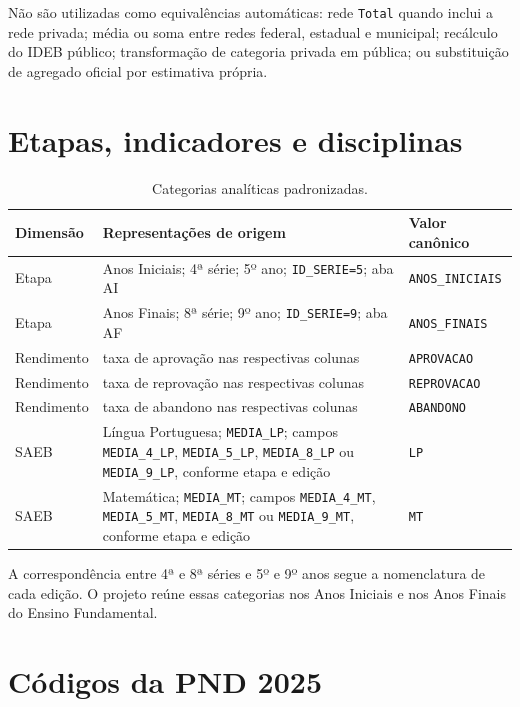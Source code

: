 Não são utilizadas como equivalências automáticas: rede \texttt{Total} quando inclui a rede privada; média ou soma entre redes federal, estadual e municipal; recálculo do IDEB público; transformação de categoria privada em pública; ou substituição de agregado oficial por estimativa própria.

\section{Etapas, indicadores e disciplinas}

\begin{table}[H]
\centering
\scriptsize
\caption{Categorias analíticas padronizadas.}
\label{tab:ap-categorias-canonicas}
\renewcommand{\arraystretch}{1.15}
\begin{tabular}{|p{3.0cm}|p{6.2cm}|p{5.7cm}|}
\hline
\textbf{Dimensão} & \textbf{Representações de origem} & \textbf{Valor canônico} \\ \hline
Etapa & Anos Iniciais; 4ª série; 5º ano; \texttt{ID\_SERIE=5}; aba AI & \texttt{ANOS\_INICIAIS} \\ \hline
Etapa & Anos Finais; 8ª série; 9º ano; \texttt{ID\_SERIE=9}; aba AF & \texttt{ANOS\_FINAIS} \\ \hline
Rendimento & taxa de aprovação nas respectivas colunas & \texttt{APROVACAO} \\ \hline
Rendimento & taxa de reprovação nas respectivas colunas & \texttt{REPROVACAO} \\ \hline
Rendimento & taxa de abandono nas respectivas colunas & \texttt{ABANDONO} \\ \hline
SAEB & Língua Portuguesa; \texttt{MEDIA\_LP}; campos \texttt{MEDIA\_4\_LP}, \texttt{MEDIA\_5\_LP}, \texttt{MEDIA\_8\_LP} ou \texttt{MEDIA\_9\_LP}, conforme etapa e edição & \texttt{LP} \\ \hline
SAEB & Matemática; \texttt{MEDIA\_MT}; campos \texttt{MEDIA\_4\_MT}, \texttt{MEDIA\_5\_MT}, \texttt{MEDIA\_8\_MT} ou \texttt{MEDIA\_9\_MT}, conforme etapa e edição & \texttt{MT} \\ \hline
\end{tabular}
\end{table}

A correspondência entre 4ª e 8ª séries e 5º e 9º anos segue a nomenclatura de cada edição. O projeto reúne essas categorias nos Anos Iniciais e nos Anos Finais do Ensino Fundamental.

\section{Códigos da PND 2025}

